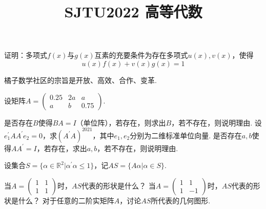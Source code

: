 \documentclass[windows]{BHCexam}
\begin{document}
	
	\title{SJTU2022 高等代数}
	
	
	\maketitle
	
	\begin{groups}
        \begin{questions}
            \question 证明：多项式$f(x)$与$g(x)$互素的充要条件为存在多项式$u(x),v(x)$，使得
            $$
                u(x)f(x)+v(x)g(x) = 1
            $$
        \end{questions}

        \begin{solution}{4cm}
            \method 橘子数学社区的宗旨是开放、高效、合作、变革.
        \end{solution}

        \begin{questions}
            \question 设矩阵$A= \begin{pmatrix}
                0.25 & 2a & a \\ 
                a & b & 0.75
            \end{pmatrix}$.
            \begin{subquestions}
				\subquestion 是否存在$B$使得$BA=I$（单位阵），若存在，则求出$B$，若不存在，则说明理由.
				\subquestion 设$e_1^\prime A A^\prime e_2=0$，求$(A^\prime A)^{2021}$，其中$e_1,e_2$分别为二维标准单位向量.
                \subquestion 是否存在$a,b$使得$AA^\prime=I$，若存在，求出$a,b$，若不存在，则说明理由.
			\end{subquestions}
        \end{questions}
		
		\begin{questions}
            \question 设集合$S=\{\alpha \in \mathbb{R}^2 \vert \alpha^\prime \alpha \leq 1\}$，记$AS=\{A\alpha \vert \alpha \in S\}$.
            \begin{subquestions}
                \subquestion 当$A=\begin{pmatrix}
                    1 & 1 \\
                    1 & 1
                \end{pmatrix}$时，$AS$代表的形状是什么？
                \subquestion 当$A=\begin{pmatrix}
                    1 & 1 \\
                    1 & -1
                \end{pmatrix}$时，$AS$代表的形状是什么？
                \subquestion 对于任意的二阶实矩阵$A$，讨论$AS$所代表的几何图形.
            \end{subquestions}


\end{questions}
\end{groups}
\end{document}

